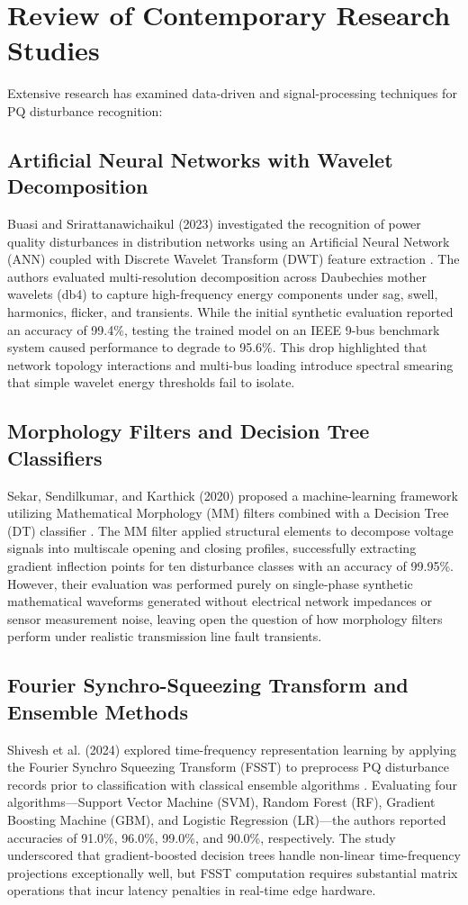 \documentclass[12pt,a4paper]{report}
\begin{document}
\section{Review of Contemporary Research Studies}
Extensive research has examined data-driven and signal-processing techniques for PQ disturbance recognition:

\subsection{Artificial Neural Networks with Wavelet Decomposition}
Buasi and Srirattanawichaikul (2023) investigated the recognition of power quality disturbances in distribution networks using an Artificial Neural Network (ANN) coupled with Discrete Wavelet Transform (DWT) feature extraction \cite{buasi2023}. The authors evaluated multi-resolution decomposition across Daubechies mother wavelets (db4) to capture high-frequency energy components under sag, swell, harmonics, flicker, and transients. While the initial synthetic evaluation reported an accuracy of 99.4\%, testing the trained model on an IEEE 9-bus benchmark system caused performance to degrade to 95.6\%. This drop highlighted that network topology interactions and multi-bus loading introduce spectral smearing that simple wavelet energy thresholds fail to isolate.

\subsection{Morphology Filters and Decision Tree Classifiers}
Sekar, Sendilkumar, and Karthick (2020) proposed a machine-learning framework utilizing Mathematical Morphology (MM) filters combined with a Decision Tree (DT) classifier \cite{sekar2020}. The MM filter applied structural elements to decompose voltage signals into multiscale opening and closing profiles, successfully extracting gradient inflection points for ten disturbance classes with an accuracy of 99.95\%. However, their evaluation was performed purely on single-phase synthetic mathematical waveforms generated without electrical network impedances or sensor measurement noise, leaving open the question of how morphology filters perform under realistic transmission line fault transients.

\subsection{Fourier Synchro-Squeezing Transform and Ensemble Methods}
Shivesh et al. (2024) explored time-frequency representation learning by applying the Fourier Synchro Squeezing Transform (FSST) to preprocess PQ disturbance records prior to classification with classical ensemble algorithms \cite{shivesh2024}. Evaluating four algorithms---Support Vector Machine (SVM), Random Forest (RF), Gradient Boosting Machine (GBM), and Logistic Regression (LR)---the authors reported accuracies of 91.0\%, 96.0\%, 99.0\%, and 90.0\%, respectively. The study underscored that gradient-boosted decision trees handle non-linear time-frequency projections exceptionally well, but FSST computation requires substantial matrix operations that incur latency penalties in real-time edge hardware.
\end{document}
